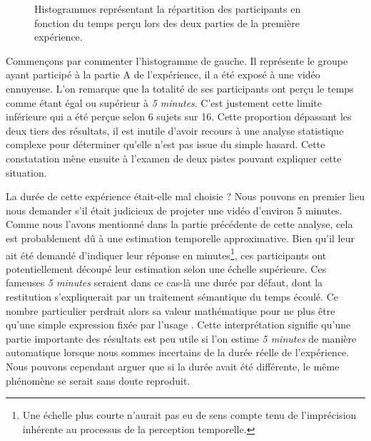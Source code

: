 \documentclass[12pt,fleqn,oneside,french,openany]{book} %
\begin{document}
\begin{figure}[h!]
\centering
\begin{minipage}[t]{.49\textwidth}
\end{minipage}
\hfill
\begin{minipage}[t]{.49\textwidth}
\end{minipage}
\caption{Histogrammes représentant la répartition des participants en fonction du temps perçu lors des deux parties de la première expérience.}
\end{figure}

Commençons par commenter l'histogramme de gauche. Il représente le groupe ayant participé à la partie A de l'expérience, il a été exposé à une vidéo ennuyeuse. L'on remarque que la totalité de ses participants ont perçu le temps comme étant égal ou supérieur à \emph{5 minutes}. C'est justement cette limite inférieure qui a été perçue selon 6 sujets sur 16. Cette proportion dépassant les deux tiers des résultats, il est inutile d'avoir recours à une analyse statistique complexe pour déterminer qu'elle n'est pas issue du simple hasard. Cette constatation mène ensuite à l'examen de deux pistes pouvant expliquer cette situation.

La durée de cette expérience était-elle mal choisie ? Nous pouvons en premier lieu nous demander s'il était judicieux de projeter une vidéo d'environ 5 minutes. Comme nous l'avons mentionné dans la partie précédente de cette analyse, cela est probablement dû à une estimation temporelle approximative. Bien qu'il leur ait été demandé d'indiquer leur réponse en minutes\footnote{Une échelle plus courte n'aurait pas eu de sens compte tenu de l'imprécision inhérente au processus de la perception temporelle.}, ces participants ont potentiellement découpé leur estimation selon une échelle supérieure. Ces fameuses \emph{5 minutes} seraient dans ce cas-là une durée par défaut, dont la restitution s'expliquerait par un traitement sémantique du temps écoulé. Ce nombre particulier perdrait alors sa valeur mathématique pour ne plus être qu'une simple expression fixée par l'usage \cite{durand1970}. Cette interprétation signifie qu'une partie importante des résultats est peu utile si l'on estime \emph{5 minutes} de manière automatique lorsque nous sommes incertains de la durée réelle de l'expérience. Nous pouvons cependant arguer que si la durée avait été différente, le même phénomène se serait sans doute reproduit. 
\end{document}
